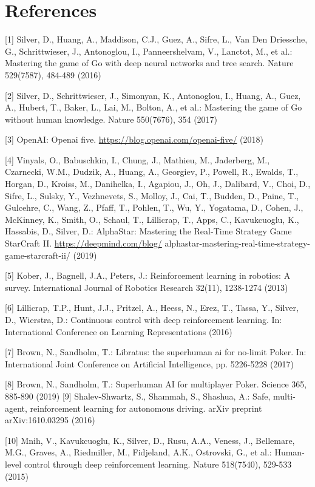\documentclass[10pt]{article}
\begin{document}
\section{References}
[1] Silver, D., Huang, A., Maddison, C.J., Guez, A., Sifre, L., Van Den Driessche, G., Schrittwieser, J., Antonoglou, I., Panneershelvam, V., Lanctot, M., et al.: Mastering the game of Go with deep neural networks and tree search. Nature 529(7587), 484-489 (2016)

[2] Silver, D., Schrittwieser, J., Simonyan, K., Antonoglou, I., Huang, A., Guez, A., Hubert, T., Baker, L., Lai, M., Bolton, A., et al.: Mastering the game of Go without human knowledge. Nature 550(7676), 354 (2017)

[3] OpenAI: Openai five. \href{https://blog.openai.com/openai-five/}{https://blog.openai.com/openai-five/} (2018)

[4] Vinyals, O., Babuschkin, I., Chung, J., Mathieu, M., Jaderberg, M., Czarnecki, W.M., Dudzik, A., Huang, A., Georgiev, P., Powell, R., Ewalds, T., Horgan, D., Kroiss, M., Danihelka, I., Agapiou, J., Oh, J., Dalibard, V., Choi, D., Sifre, L., Sulsky, Y., Vezhnevets, S., Molloy, J., Cai, T., Budden, D., Paine, T., Gulcehre, C., Wang, Z., Pfaff, T., Pohlen, T., Wu, Y., Yogatama, D., Cohen, J., McKinney, K., Smith, O., Schaul, T., Lillicrap, T., Apps, C., Kavukcuoglu, K., Hassabis, D., Silver, D.: AlphaStar: Mastering the Real-Time Strategy Game StarCraft II. \href{https://deepmind.com/blog/}{https://deepmind.com/blog/} alphastar-mastering-real-time-strategy-game-starcraft-ii/ (2019)

[5] Kober, J., Bagnell, J.A., Peters, J.: Reinforcement learning in robotics: A survey. International Journal of Robotics Research 32(11), 1238-1274 (2013)

[6] Lillicrap, T.P., Hunt, J.J., Pritzel, A., Heess, N., Erez, T., Tassa, Y., Silver, D., Wierstra, D.: Continuous control with deep reinforcement learning. In: International Conference on Learning Representations (2016)

[7] Brown, N., Sandholm, T.: Libratus: the superhuman ai for no-limit Poker. In: International Joint Conference on Artificial Intelligence, pp. 5226-5228 (2017)

[8] Brown, N., Sandholm, T.: Superhuman AI for multiplayer Poker. Science 365, 885-890 (2019) [9] Shalev-Shwartz, S., Shammah, S., Shashua, A.: Safe, multi-agent, reinforcement learning for autonomous driving. arXiv preprint arXiv:1610.03295 (2016)

[10] Mnih, V., Kavukcuoglu, K., Silver, D., Rusu, A.A., Veness, J., Bellemare, M.G., Graves, A., Riedmiller, M., Fidjeland, A.K., Ostrovski, G., et al.: Human-level control through deep reinforcement learning. Nature 518(7540), 529-533 (2015)
\end{document}
